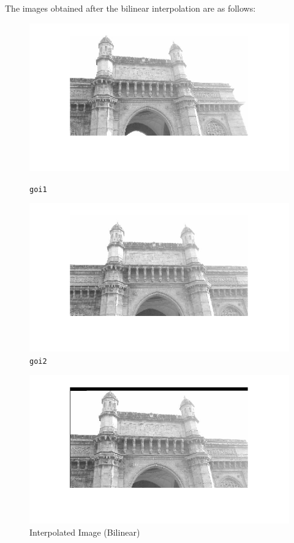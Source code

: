 \documentclass{article}
\begin{document}
The images obtained after the bilinear interpolation are as follows:
\begin{figure}[htbp]
    \centering
    \begin{minipage}[b]{0.45\textwidth}
        \includegraphics[width=\textwidth]{bilinear_im1.png}
        \caption{\texttt{goi1}}
    \end{minipage}
    \begin{minipage}[b]{0.45\textwidth}
        \includegraphics[width=\textwidth]{bilinear_im2.png}
        \caption{\texttt{goi2}}
    \end{minipage}
\end{figure}
\begin{figure}[!htb]
    \includegraphics[width=\textwidth]{bilinear_im4.png}
    \caption{Interpolated Image (Bilinear)}
\end{figure}
\end{document}
